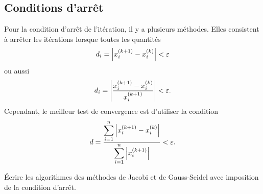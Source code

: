 \subsection{Conditions d'arrêt}

Pour la condition d'arrêt de l'itération, il y a plusieurs méthodes. Elles
consistent à arrêter les itérations lorsque toutes les quantités
\[
  d_i = \left|x_i^{(k+1)} - x_i^{(k)}\right| < \varepsilon
\]
ou aussi
\[
  d_i = \left|\frac{x_i^{(k+1)} - x_i^{(k)}}{x_i^{(k+1)}}\right| < \varepsilon .
\]
Cependant, le meilleur test de convergence est d'utiliser la condition
\[
  d = \frac{\displaystyle\sum_{i=1}^{n}\left|x_i^{(k+1)} - x_i^{(k)}\right|}
           {\displaystyle\sum_{i=1}^{n}\left|x_i^{(k+1)}\right|} < \varepsilon .
\]

\begin{exercice}
Écrire les algorithmes des méthodes de Jacobi et de Gauss-Seidel avec
imposition de la condition d'arrêt.
\end{exercice}

